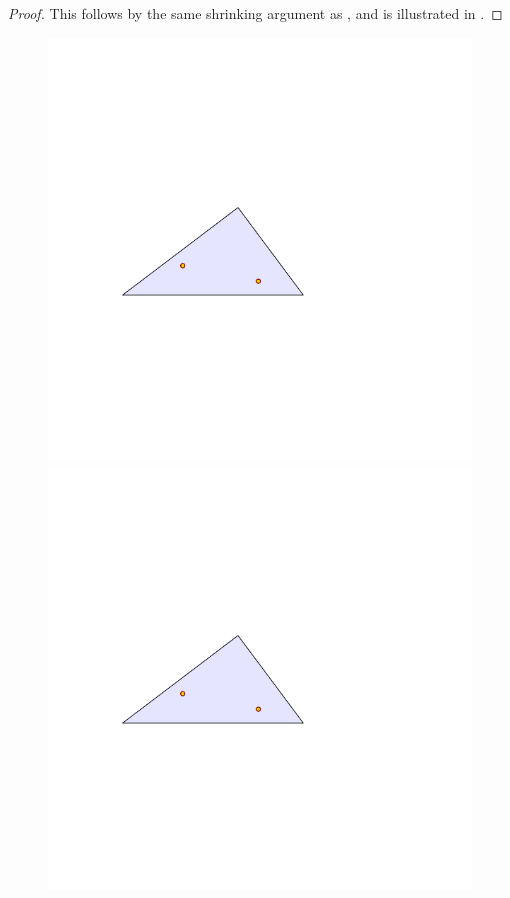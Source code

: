 \documentclass[12pt]{article}%
\begin{document}
\begin{proof}
    This follows by the same shrinking argument as
    , and is illustrated in 
    .   
\end{proof}

\begin{figure}[h]
    \includegraphics[page=1]{figs/narrow_triangle} \hfill
    \includegraphics[page=2]{figs/narrow_triangle} \hfill

\end{figure}
\end{document}
